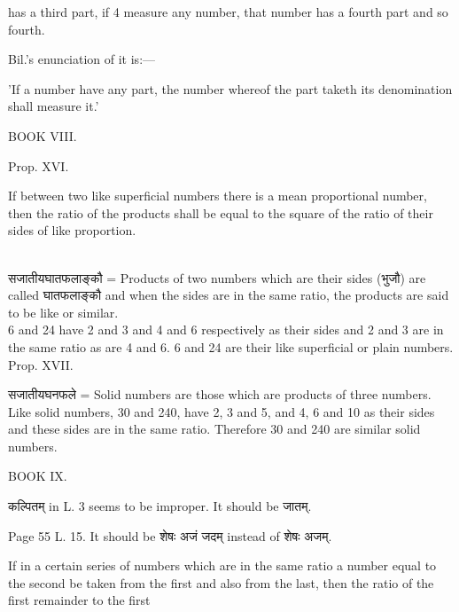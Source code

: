 \documentclass[11pt, openany]{book}
\begin{document}
\newpage
{\en has a third part, if 4 measure any number, that number has a fourth part
and so fourth.}\\


{\en Bil.'s enunciation of it is:---

'If a number have any part, the number whereof the part taketh its
denomination shall measure it.'}
\begin{center}
{\en BOOK VIII.}
\end{center}
{\en Prop. XVI.

If between two like superficial numbers there is a mean
proportional number, then the ratio of the products shall be
equal to the square of the ratio of their sides of like proportion.}\\

 सजातीयघातफलाङ्कौ = {\en Products of two numbers which are their sides} (भुजौ) {\en are called} घातफलाङ्कौ {\en and when the sides are in the same ratio, the products are said to be like or similar.\\

6 and 24 have 2 and 3 and 4 and 6 respectively as their sides and 2 and 3 are in the same ratio as are 4 and 6. 6 and 24 are their like superficial or plain numbers.\\

\noindent Prop. XVII.}

 सजातीयघनफले = {\en Solid numbers are those which are products of three numbers. Like solid numbers, 30 and 240, have 2, 3 and 5, and 4, 6 and 10 as their sides and these sides are in the same ratio. Therefore 30 and 240 are similar solid numbers.}
\begin{center}
{\en BOOK IX.}
\end{center}

 कल्पितम् {\en in L. 3 seems to be improper. It should be} जातम्.\\


{\en Page 55 L. 15. It should be} शेषः अजं जदम् {\en instead of} शेषः अजम्.\\


{\en If in a certain series of numbers which are in the same ratio a number equal to the second be taken from the first and also from the last, then the ratio of the first remainder to the first}
\end{document}
